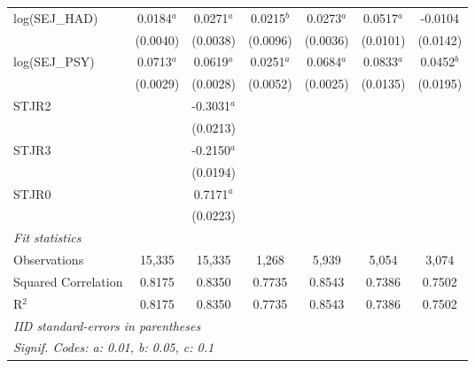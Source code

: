 \begin{tabular}{lcccccc}
   log(SEJ\_HAD)       & 0.0184$^{a}$ & 0.0271$^{a}$  & 0.0215$^{b}$ & 0.0273$^{a}$  & 0.0517$^{a}$ & -0.0104\\   
                       & (0.0040)     & (0.0038)      & (0.0096)     & (0.0036)      & (0.0101)     & (0.0142)\\   
   log(SEJ\_PSY)       & 0.0713$^{a}$ & 0.0619$^{a}$  & 0.0251$^{a}$ & 0.0684$^{a}$  & 0.0833$^{a}$ & 0.0452$^{b}$\\   
                       & (0.0029)     & (0.0028)      & (0.0052)     & (0.0025)      & (0.0135)     & (0.0195)\\   
   STJR2               &              & -0.3031$^{a}$ &              &               &              &   \\   
                       &              & (0.0213)      &              &               &              &   \\   
   STJR3               &              & -0.2150$^{a}$ &              &               &              &   \\   
                       &              & (0.0194)      &              &               &              &   \\   
   STJR0               &              & 0.7171$^{a}$  &              &               &              &   \\   
                       &              & (0.0223)      &              &               &              &   \\   
   \midrule
   \emph{Fit statistics}\\
   Observations        & 15,335       & 15,335        & 1,268        & 5,939         & 5,054        & 3,074\\  
   Squared Correlation & 0.8175       & 0.8350        & 0.7735       & 0.8543        & 0.7386       & 0.7502\\  
   R$^2$               & 0.8175       & 0.8350        & 0.7735       & 0.8543        & 0.7386       & 0.7502\\  
   \midrule \midrule
   \multicolumn{7}{l}{\emph{IID standard-errors in parentheses}}\\
   \multicolumn{7}{l}{\emph{Signif. Codes: a: 0.01, b: 0.05, c: 0.1}}\\
\end{tabular}
\par\endgroup


